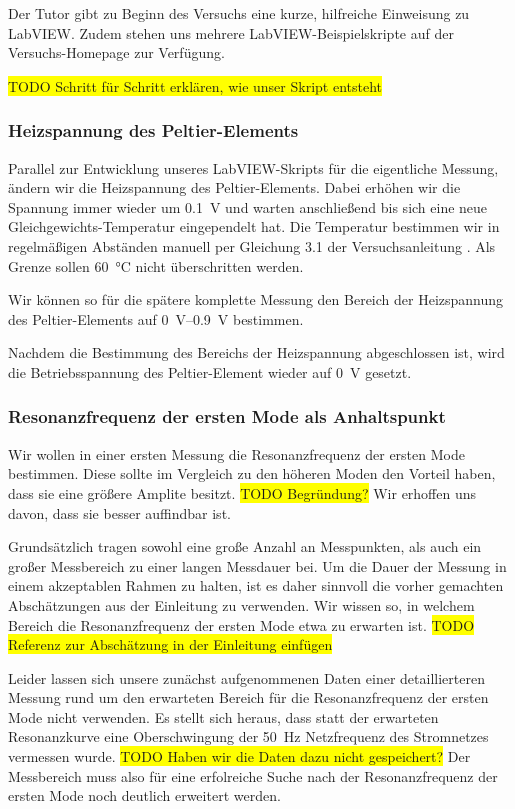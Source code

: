 Der Tutor gibt zu Beginn des Versuchs eine kurze, hilfreiche Einweisung zu LabVIEW.
Zudem stehen uns mehrere LabVIEW-Beispielskripte auf der Versuchs-Homepage zur Verfügung.

\colorbox{yellow}{TODO Schritt für Schritt erklären, wie unser Skript entsteht}

\subsubsection*{Heizspannung des Peltier-Elements}

Parallel zur Entwicklung unseres LabVIEW-Skripts für die eigentliche Messung, ändern wir die Heizspannung des Peltier-Elements.
Dabei erhöhen wir die Spannung immer wieder um \SI{0.1}{\volt} und warten anschließend bis sich eine neue Gleichgewichts-Temperatur eingependelt hat.
Die Temperatur bestimmen wir in regelmäßigen Abständen manuell per Gleichung 3.1 der Versuchsanleitung \cite{Anleitung}.
Als Grenze sollen \SI{60}{\celsius} nicht überschritten werden.

Wir können so für die spätere komplette Messung den Bereich der Heizspannung des Peltier-Elements auf \SIrange{0}{0.9}{\volt} bestimmen.

Nachdem die Bestimmung des Bereichs der Heizspannung abgeschlossen ist, wird die Betriebsspannung des Peltier-Element wieder auf \SI{0}{\volt} gesetzt.

\subsubsection*{Resonanzfrequenz der ersten Mode als Anhaltspunkt}

Wir wollen in einer ersten Messung die Resonanzfrequenz der ersten Mode bestimmen.
Diese sollte im Vergleich zu den höheren Moden den Vorteil haben, dass sie eine größere Amplite besitzt.
\colorbox{yellow}{TODO Begründung?}
Wir erhoffen uns davon, dass sie besser auffindbar ist.

Grundsätzlich tragen sowohl eine große Anzahl an Messpunkten, als auch ein großer Messbereich zu einer langen Messdauer bei.
Um die Dauer der Messung in einem akzeptablen Rahmen zu halten, ist es daher sinnvoll die vorher gemachten Abschätzungen aus der Einleitung zu verwenden.
Wir wissen so, in welchem Bereich die Resonanzfrequenz der ersten Mode etwa zu erwarten ist.
\colorbox{yellow}{TODO Referenz zur Abschätzung in der Einleitung einfügen}

Leider lassen sich unsere zunächst aufgenommenen Daten einer detaillierteren Messung rund um den erwarteten Bereich für die Resonanzfrequenz der ersten Mode nicht verwenden.
Es stellt sich heraus, dass statt der erwarteten Resonanzkurve eine Oberschwingung der \SI{50}{\hertz} Netzfrequenz des Stromnetzes vermessen wurde.
\colorbox{yellow}{TODO Haben wir die Daten dazu nicht gespeichert?}
Der Messbereich muss also für eine erfolreiche Suche nach der Resonanzfrequenz der ersten Mode noch deutlich erweitert werden.

